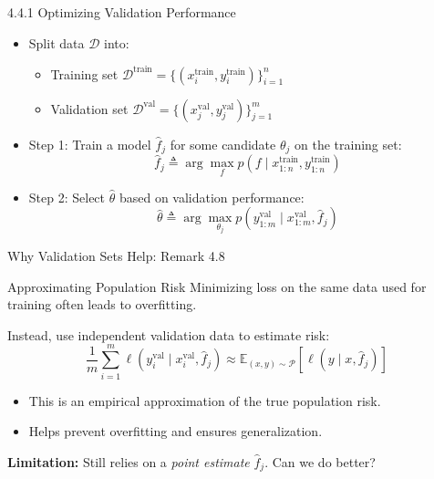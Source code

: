 \documentclass[handout,aspectratio=169]{beamer}
\begin{document}
\begin{frame}{4.4.1 Optimizing Validation Performance}
\begin{itemize}
    \item Split data $\mathcal{D}$ into:
    \begin{itemize}
        \item Training set $\mathcal{D}^{\text{train}} = \{(x^{\text{train}}_i, y^{\text{train}}_i)\}_{i=1}^n$
        \item Validation set $\mathcal{D}^{\text{val}} = \{(x^{\text{val}}_j, y^{\text{val}}_j)\}_{j=1}^m$
    \end{itemize}
    \item Step 1: Train a model $\hat{f}_j$ for some candidate $\theta_j$ on the training set:
    \[
    \hat{f}_j \triangleq \arg\max_f p(f \mid x_{1:n}^{\text{train}}, y_{1:n}^{\text{train}}) \tag{4.22}
    \]
    \item Step 2: Select $\hat{\theta}$ based on validation performance:
    \[
    \hat{\theta} \triangleq \arg\max_{\theta_j} p(y_{1:m}^{\text{val}} \mid x_{1:m}^{\text{val}}, \hat{f}_j) \tag{4.23}
    \]
\end{itemize}
\pause

\end{frame}

\begin{frame}{Why Validation Sets Help: Remark 4.8}
\begin{block}{Approximating Population Risk}
Minimizing loss on the same data used for training often leads to overfitting.

Instead, use independent validation data to estimate risk:
\[
\frac{1}{m} \sum_{i=1}^{m} \ell(y_i^{\text{val}} \mid x_i^{\text{val}}, \hat{f}_j) \approx \mathbb{E}_{(x, y) \sim \mathcal{P}} \left[\ell(y \mid x, \hat{f}_j)\right] \tag{4.24}
\]

\begin{itemize}
    \item This is an empirical approximation of the true population risk.
    \item Helps prevent overfitting and ensures generalization.
\end{itemize}
\end{block}

\pause
\vspace{0.3cm}
\textbf{Limitation:} Still relies on a \textit{point estimate} $\hat{f}_j$. Can we do better?
\end{frame}
\end{document}
